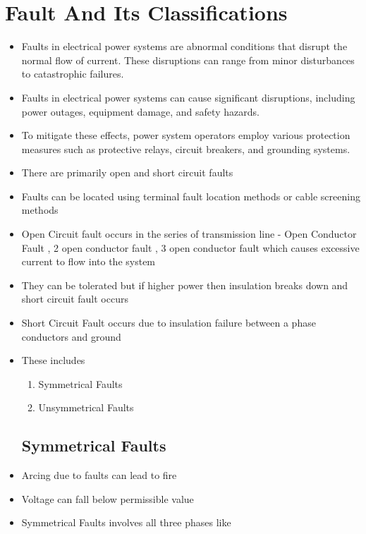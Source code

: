 \documentclass[14pt ,a4paper]{extarticle}
\begin{document}
\tableofcontents
\pagebreak

\section{Fault And Its Classifications}
\begin{itemize}
    \item{Faults in electrical power systems are abnormal conditions that disrupt the normal flow of current. These disruptions can range from minor disturbances to catastrophic failures.}
    \item{Faults in electrical power systems can cause significant disruptions,
 including power outages, equipment damage, and safety hazards.}
\item{ To mitigate these effects, power system operators employ various protection measures such as protective relays, circuit breakers, and grounding systems.}
    \item{There are primarily open and short circuit faults}
    \item{Faults can be located using terminal fault location methods or cable screening methods}

    \item{Open Circuit fault occurs in the series of transmission line - Open Conductor Fault , 2 open conductor fault , 3 open conductor fault which causes excessive current to flow into the system}
    \item{They can be tolerated but if higher power then insulation breaks down and short circuit fault occurs}
    \item{Short Circuit Fault occurs due to insulation failure between a phase conductors and ground}
    \item{These includes}
        \begin{enumerate}
            \item{Symmetrical Faults}
            \item{Unsymmetrical Faults}
        \end{enumerate}
        \vspace{40pt}
    \subsection{Symmetrical Faults}
    \item{Arcing due to faults can lead to fire}
    \item{Voltage can fall below permissible value}
        \vspace{50pt}
        \item{Symmetrical Faults involves all three phases like}


\end{itemize}
\end{document}
